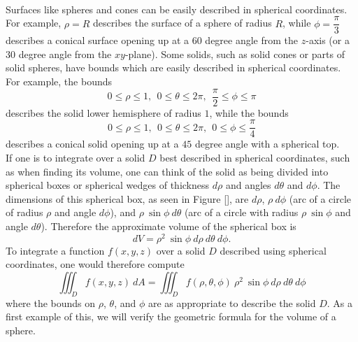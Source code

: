  \\

Surfaces like spheres and cones can be easily described in spherical coordinates.  For example, $\rho = R$ describes the surface of a sphere of radius $R$, while $\phi = \dfrac{\pi}{3}$ describes a conical surface opening up at a $60$ degree angle from the $z$-axis (or a $30$ degree angle from the $xy$-plane). Some solids, such as solid cones or parts of solid spheres, have bounds which are easily described in spherical coordinates. For example, the bounds
$$0 \leq \rho \leq 1, \: \:  0 \leq \theta \leq 2\pi, \: \: \dfrac{\pi}{2} \leq \phi \leq \pi$$
describes the solid lower hemisphere of radius $1$, while the bounds
$$0 \leq \rho \leq 1, \: \:  0 \leq \theta \leq 2\pi, \: \: 0 \leq \phi \leq \dfrac{\pi}{4}$$
describes a conical solid opening up at a $45$ degree angle with a spherical top.\\

If one is to integrate over a solid $D$ best described in spherical coordinates, such as when finding its volume, one can think of the solid as being divided into spherical boxes or spherical wedges of thickness $d\rho$ and angles $d\theta$ and $d\phi$.  The dimensions of this spherical box, as seen in Figure \ref{}, are $d\rho$, $\rho \: d\phi$ (arc of a circle of radius $\rho$ and angle $d\phi$), and $\rho \: \sin\phi \: d\theta$ (arc of a circle with radius $\rho \: \sin\phi$ and angle $d\theta$). Therefore the approximate volume of the spherical box is
$$dV = \rho^2 \: \sin\phi \: d\rho \: d\theta \: d\phi.$$
To integrate a function $f(x,y,z)$ over a solid $D$ described using spherical coordinates, one would therefore compute
$$\iiint_D f(x,y,z) \: dA = \iiint_D f(\rho,\theta,\phi) \: \rho^2 \: \sin\phi \: d\rho \: d\theta \: d\phi$$
where the bounds on $\rho$, $\theta$, and $\phi$ are as appropriate to describe the solid $D$. As a first example of this, we will verify the geometric formula for the volume of a sphere.\\

